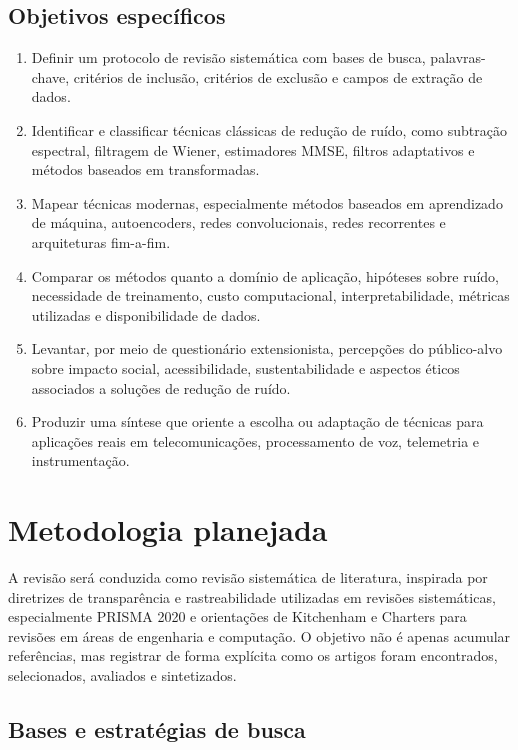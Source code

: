 \subsection{Objetivos específicos}

\begin{enumerate}[label=\alph*)]
    \item Definir um protocolo de revisão sistemática com bases de busca, palavras-chave, critérios de inclusão, critérios de exclusão e campos de extração de dados.
    \item Identificar e classificar técnicas clássicas de redução de ruído, como subtração espectral, filtragem de Wiener, estimadores MMSE, filtros adaptativos e métodos baseados em transformadas.
    \item Mapear técnicas modernas, especialmente métodos baseados em aprendizado de máquina, autoencoders, redes convolucionais, redes recorrentes e arquiteturas fim-a-fim.
    \item Comparar os métodos quanto a domínio de aplicação, hipóteses sobre ruído, necessidade de treinamento, custo computacional, interpretabilidade, métricas utilizadas e disponibilidade de dados.
    \item Levantar, por meio de questionário extensionista, percepções do público-alvo sobre impacto social, acessibilidade, sustentabilidade e aspectos éticos associados a soluções de redução de ruído.
    \item Produzir uma síntese que oriente a escolha ou adaptação de técnicas para aplicações reais em telecomunicações, processamento de voz, telemetria e instrumentação.
\end{enumerate}

\section{Metodologia planejada}

A revisão será conduzida como revisão sistemática de literatura, inspirada por diretrizes de transparência e rastreabilidade utilizadas em revisões sistemáticas, especialmente PRISMA 2020 e orientações de Kitchenham e Charters para revisões em áreas de engenharia e computação. O objetivo não é apenas acumular referências, mas registrar de forma explícita como os artigos foram encontrados, selecionados, avaliados e sintetizados.

\subsection{Bases e estratégias de busca}

